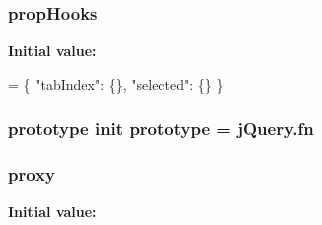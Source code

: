 \hypertarget{jquery-1_810_82-vsdoc_8js_a6bf604bb8f2c26858d3e413ccebaa079}{
\subsubsection[{prop\-Hooks}]{ prop\-Hooks}}\label{jquery-1_810_82-vsdoc_8js_a6bf604bb8f2c26858d3e413ccebaa079}
{\bfseries Initial value\-:}
\begin{DoxyCode}
= \{ \textcolor{stringliteral}{"tabIndex"}: \{\},
\textcolor{stringliteral}{"selected"}: \{\} \}
\end{DoxyCode}
\hypertarget{jquery-1_810_82-vsdoc_8js_ab5e5d0976552f788d31448ed049ae4a4}{
\subsubsection[{prototype}]{ prototype {\bf init} prototype = {\bf j\-Query.\-fn}}}\label{jquery-1_810_82-vsdoc_8js_ab5e5d0976552f788d31448ed049ae4a4}
\hypertarget{jquery-1_810_82-vsdoc_8js_af0c0a2dd63f5d59bf5dea9f132dec59e}{
\subsubsection[{proxy}]{ proxy}}\label{jquery-1_810_82-vsdoc_8js_af0c0a2dd63f5d59bf5dea9f132dec59e}
{\bfseries Initial value\-:}
